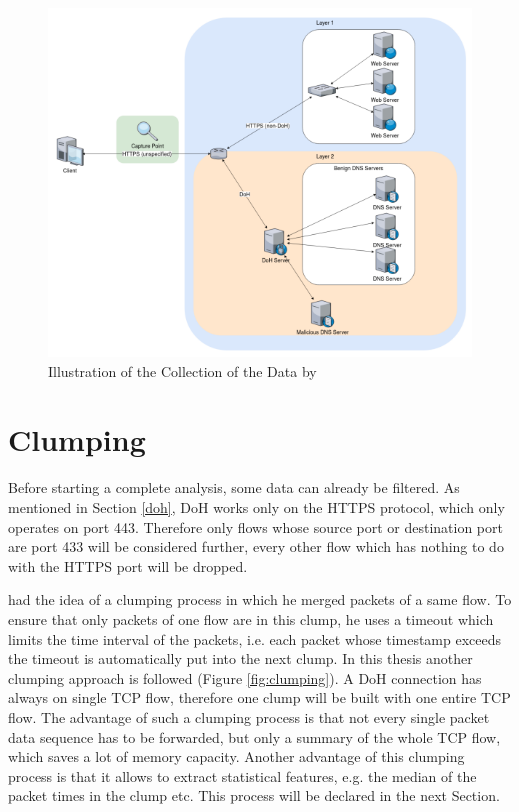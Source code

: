 \begin{figure} [h]
\includegraphics[scale=0.85]{images/data_set.PNG}
\centering
\caption{Illustration of the Collection of the Data by \cite{montazerishatoori2020anomaly}}
\label{fig:data_set}
\end{figure}

\section{Clumping} \label{clumping}
Before starting a complete analysis, some data can already be filtered. As mentioned in Section \ref{doh}, DoH works only on the HTTPS protocol, which only operates on port 443. Therefore only flows whose source port or destination port are port 433 will be considered further, every other flow which has nothing to do with the HTTPS port will be dropped.

\cite{montazerishatoori2020anomaly} had the idea of a clumping process in which he merged packets of a same flow. To ensure that only packets of one flow are in this clump, he uses a timeout which limits the time interval of the packets, i.e. each packet whose timestamp exceeds the timeout is automatically put into the next clump. In this thesis another clumping approach is followed (Figure \ref{fig:clumping}). A DoH connection has always on single TCP flow, therefore one clump will be built with one entire TCP flow. The advantage of such a clumping process is that not every single packet data sequence has to be forwarded, but only a summary of the whole TCP flow, which saves a lot of memory capacity. Another advantage of this clumping process is that it allows to extract statistical features, e.g. the median of the packet times in the clump etc. This process will be declared in the next Section.

